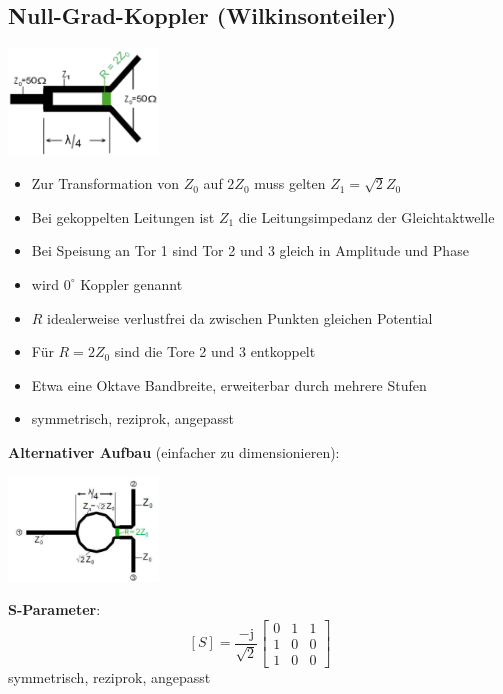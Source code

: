 \documentclass[english]{latex4ei/latex4ei_sheet}
\begin{document}
\begin{sectionbox}
	\subsection{Null-Grad-Koppler (Wilkinsonteiler)}
	\begin{center}\includegraphics[width = 4cm]{./img/wilkinsonteiler.png}\end{center}
	\begin{itemize}
		\item Zur Transformation von $Z_0$ auf $2Z_0$ muss gelten $Z_1 = \sqrt{2}Z_0$
		\item Bei gekoppelten Leitungen ist $Z_1$ die Leitungsimpedanz der Gleichtaktwelle
		\item Bei Speisung an Tor 1 sind Tor 2 und 3 gleich in Amplitude und Phase
		\item wird $0^{\circ}$ Koppler genannt
		\item $R$ idealerweise verlustfrei da zwischen Punkten gleichen Potential
		\item Für $R = 2Z_0$ sind die Tore 2 und 3 entkoppelt
		\item Etwa eine Oktave Bandbreite, erweiterbar durch mehrere Stufen
		\item symmetrisch, reziprok, angepasst
	\end{itemize}

\textbf{Alternativer Aufbau} (einfacher zu dimensionieren):\\
	\begin{center}\includegraphics[width = 4cm]{./img/null_grad_koppler_rund.png}\end{center}
\textbf{S-Parameter}:\\
$$
[S]=\frac{-\mathrm{j}}{\sqrt{2}}\left[\begin{array}{lll}
	0 & 1 & 1 \\
	1 & 0 & 0 \\
	1 & 0 & 0
\end{array}\right]
$$
symmetrisch, reziprok, angepasst
\end{sectionbox}
\end{document}
